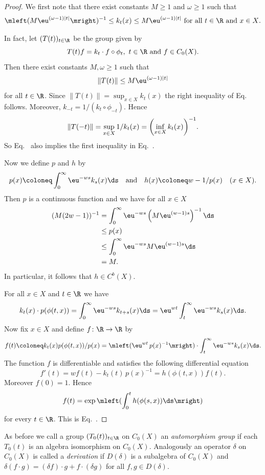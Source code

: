 \begin{proof}
We first note that there exist constants $M \geq 1 $ and $\omega \geq 1$ such that
\begin{equation}\label{eq:b2-3.16}
\mleft( M\eu^{(\omega-1)|t|} \mright)^{-1} \leq k_{t}(x) 
	\leq M\eu^{(\omega-1)|t|} \text{ for all $t \in \R$ and  $x \in X$.}
\end{equation}

In fact, let $(T(t))_{t \in \R}$ be the group given by 
%
\[
	T(t)f = k_{t} \cdot f \circ \phi_{t}, 
	\text{ $ t \in \R$ and $f \in C_{0}(X)$}.
\]
%
Then there exist constants $M, \omega \geq 1$ such that
\begin{equation}\label{eq:b2-3.17}
\|T(t)\| \leq M\eu^{(\omega-1)|t|}
\end{equation}
for all $t \in \R$.
Since $\|T(t)\| = \sup_{x \in X} k_{t}(x)$ the right inequality of
Eq.~ follows.
Moreover, $k_{-t} = 1/(k_{t} \circ \phi_{-t})$.
Hence 
%
\[
	\|T(-t)\| = \sup_{x \in X} 1/k_{t}(x) = \mleft( \inf_{x \in X} k_{t}(x) \mright)^{-1} .
\]
%
So Eq.~ also implies the first inequality in Eq.~.

Now we define $p$ and $h$ by
\[
p(x) \coloneq \int_{0}^{\infty} \eu^{-ws}k_{s}(x) \ds 
\quad \text{and} \quad 
h(x) \coloneq w - 1/p(x) \quad (x \in X).
\]
Then $p$ is a continuous function and we have for all $x \in X $
\begin{align*}
(M(2w - 1))^{-1} &= \int_{0}^{\infty} \eu^{-ws}\left(M\eu^{(w-1)s}\right)^{-1} \ds \\ 
&\leq p(x) \\ 
&\leq \int_{0}^{\infty} \eu^{-ws}M\eu^{(w-1)s} \ds \\
&= M .
\end{align*}
In particular, it follows that $h \in C^{b}(X)$.

For all $x \in X$ and $t \in \R$ we have 
\[
k_{t}(x) \cdot p(\phi(t,x)) = \int_{0}^{\infty} \eu^{-ws}k_{t+s}(x) \ds 
= \eu^{wt} \int_{t}^{\infty} \eu^{-ws}k_{s}(x) \ds.
\]
Now fix $x \in X$ and define $f \colon \R \to \R$ by 
\[
f(t) \coloneq k_{t}(x)p(\phi(t,x))/p(x) 
 = \mleft( \eu^{wt}\,p(x)^{-1} \mright) \cdot \int_{t}^{\infty} \eu^{-ws}k_{s}(x)  \ds.
\]
The function $f$ is differentiable and satisfies the following differential equation 
\[
f'(t) = wf(t)  - k_{t}(t)\,p(x)^{-1}  = h(\phi(t,x))f(t).
\]
Moreover $f(0) = 1$.
Hence %
\[
	f(t) = \exp \mleft( \int_{0}^{t} h(\phi(s,x)) \ds \mright)
\]
%
for every $t \in \R$.
This is Eq.~.
\end{proof}
As before we call a group $(T_{0}(t))_{t \in \R}$ on $C_{0}(X)$ an \emph{automorphism group} if each $T_{0}(t)$ is an algebra isomorphism on $C_{0}(X)$.
Analogously an operator $\delta$ on $C_{0}(X)$ is called a \emph{derivation} if\/ $D(\delta)$ is a subalgebra of\/ $C_{0}(X)$ and $\delta(f \cdot g) = (\delta f) \cdot g + f \cdot (\delta g)$ for all $f,g \in D(\delta)$.

